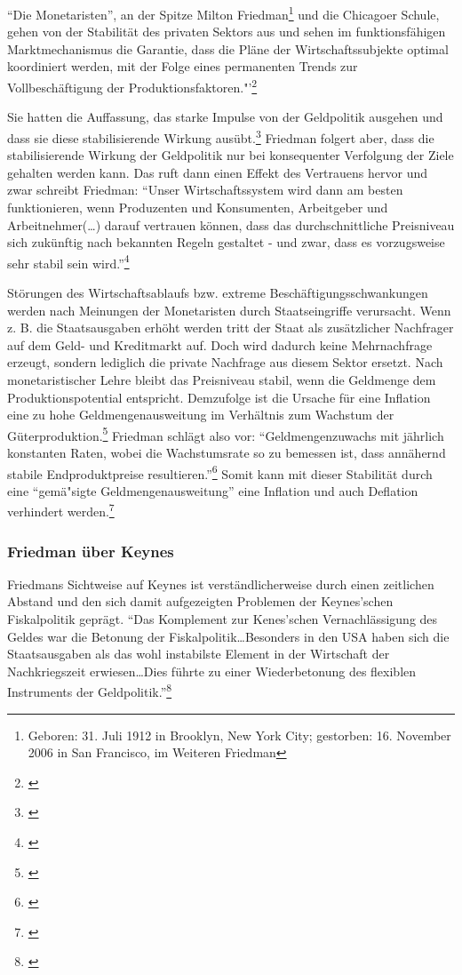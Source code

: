 \documentclass[
        onecolumn,
        a4paper,
        abstracton,
        parskip=half
        ,final
        ]{scrartcl}
\begin{document}
"`Die Monetaristen"', an der Spitze Milton Friedman\footnote[16]{Geboren: 31. Juli 1912 in Brooklyn, New York City; gestorben: 16. November 2006 in San Francisco, im Weiteren Friedman} und die Chicagoer Schule, gehen von der Stabilit{\"a}t des privaten Sektors aus und sehen im
funktionsf{\"a}higen Marktmechanismus die Garantie, dass die Pl{\"a}ne der Wirtschaftssubjekte optimal koordiniert werden, mit der Folge eines permanenten Trends zur Vollbesch{\"a}ftigung der Produktionsfaktoren."'\footnote[501]{\citep*[vgl.][S.210]{peters2000}}

Sie hatten die Auffassung, das starke Impulse von der Geldpolitik ausgehen und
dass sie diese stabilisierende Wirkung aus{\"u}bt.\footnote[502]{\citep*[S.181]{bombach1981theorie}}
Friedman folgert aber, dass die stabilisierende Wirkung der Geldpolitik nur bei konsequenter Verfolgung der Ziele gehalten werden kann. Das ruft dann einen Effekt des Vertrauens
hervor und zwar schreibt Friedman: "`Unser Wirtschaftssystem wird dann am
besten funktionieren, wenn Produzenten und Konsumenten, Arbeitgeber und
Arbeitnehmer(\ldots) darauf vertrauen k{\"o}nnen, dass das durchschnittliche
Preisniveau sich zuk{\"u}nftig nach bekannten Regeln gestaltet - und zwar, dass
es vorzugsweise sehr stabil sein wird."'\footnote[503]{\citep*[vgl.][S.150]{friedman1970die}}

St{\"o}rungen des Wirtschaftsablaufs bzw. extreme Besch{\"a}ftigungsschwankungen werden nach Meinungen der Monetaristen durch Staatseingriffe verursacht. Wenn z. B. die Staatsausgaben erh{\"o}ht werden tritt der Staat als zus{\"a}tzlicher Nachfrager auf dem Geld- und Kreditmarkt auf. Doch wird dadurch keine Mehrnachfrage erzeugt, sondern lediglich die private Nachfrage aus diesem Sektor ersetzt. Nach monetaristischer Lehre bleibt das Preisniveau stabil, wenn die Geldmenge dem Produktionspotential entspricht. Demzufolge ist die Ursache f{\"u}r eine Inflation eine zu hohe Geldmengenausweitung im Verh{\"a}ltnis zum Wachstum der G{\"u}terproduktion.\footnote[504]{\citep*[vgl.][S.213]{peters2000}}
Friedman schl{\"a}gt also vor: "`Geldmengenzuwachs mit j{\"a}hrlich konstanten Raten, wobei die Wachstumsrate so zu bemessen ist, dass ann{\"a}hernd stabile Endproduktpreise resultieren."'\footnote[505]{\citep*[vgl.][S.132]{friedman1970die}} Somit kann mit dieser
Stabilit{\"a}t durch eine "`gem{\"a}{"s}igte Geldmengenausweitung"' eine Inflation und auch
Deflation verhindert werden.\footnote[506]{\citep*[vgl.][S.155]{friedman1970die}}

\subsubsection{Friedman {\"u}ber Keynes} %
Friedmans Sichtweise auf Keynes ist verst{\"a}ndlicherweise durch einen zeitlichen Abstand und den sich damit aufgezeigten Problemen der Keynes'schen Fiskalpolitik gepr{\"a}gt. "`Das Komplement zur Kenes'schen Vernachl{\"a}ssigung des Geldes war die Betonung der
Fiskalpolitik\ldots Besonders in den USA haben sich die Staatsausgaben als das wohl instabilste Element in der Wirtschaft der Nachkriegszeit erwiesen\ldots Dies f{\"u}hrte zu einer Wiederbetonung des flexiblen Instruments der Geldpolitik."'\footnote[801]{\citep*[S.105]{friedman1970die}}
\end{document}
